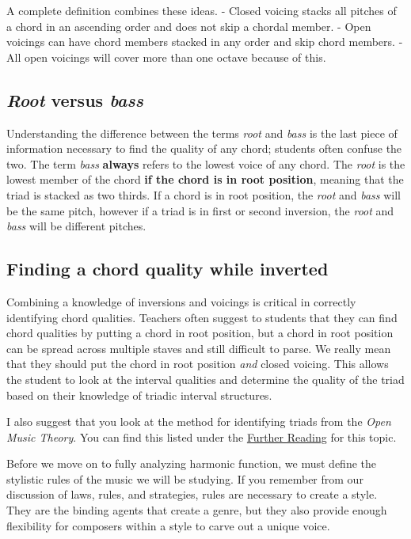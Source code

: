 \documentclass{book}
\begin{document}
A complete definition combines these ideas. - Closed voicing stacks all
pitches of a chord in an ascending order and does not skip a chordal member. -
Open voicings can have chord members stacked in any order and skip chord
members. - All open voicings will cover more than one octave because of this.

\hypertarget{root-versus-bass}{%
\subsection{\texorpdfstring{\emph{Root} versus
\emph{bass}}{Root versus bass}}\label{root-versus-bass}}

Understanding the difference between the terms \emph{root} and \emph{bass} is
the last piece of information necessary to find the quality of any chord;
students often confuse the two. The term \emph{bass} \textbf{always} refers to
the lowest voice of any chord. The \emph{root} is the lowest member of the
chord \textbf{if the chord is in root position}, meaning that the triad is
stacked as two thirds. If a chord is in root position, the \emph{root} and
\emph{bass} will be the same pitch, however if a triad is in first or second
inversion, the \emph{root} and \emph{bass} will be different pitches.

\hypertarget{finding-a-chord-quality-while-inverted}{%
\subsection{Finding a chord quality while
inverted}\label{finding-a-chord-quality-while-inverted}}

Combining a knowledge of inversions and voicings is critical in correctly
identifying chord qualities. Teachers often suggest to students that they can
find chord qualities by putting a chord in root position, but a chord in root
position can be spread across multiple staves and still difficult to parse. We
really mean that they should put the chord in root position \emph{and} closed
voicing. This allows the student to look at the interval qualities and
determine the quality of the triad based on their knowledge of triadic
interval structures.

I also suggest that you look at the method for identifying triads from the
\emph{Open Music Theory}. You can find this listed under the
\href{03-triads-7chords-leadsheet//a2-triads.html}{Further Reading} for this
topic.

Before we move on to fully analyzing harmonic function, we must define the
stylistic rules of the music we will be studying. If you remember from our
discussion of laws, rules, and strategies, rules are necessary to create a
style. They are the binding agents that create a genre, but they also provide
enough flexibility for composers within a style to carve out a unique voice.
\end{document}
